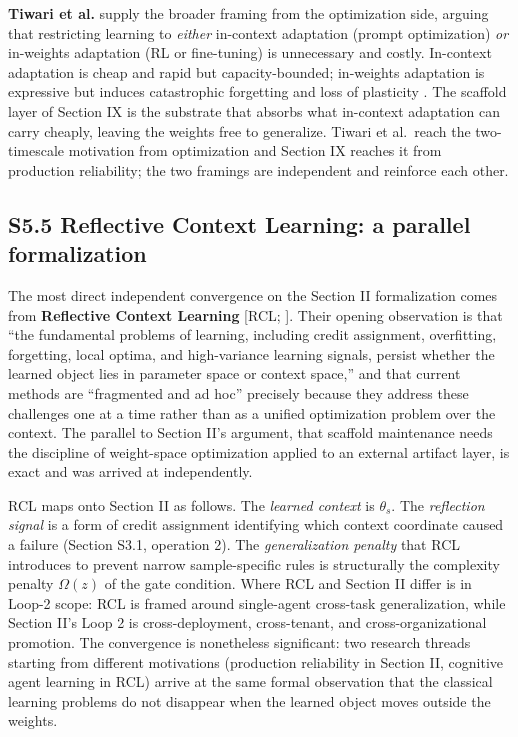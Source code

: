 \documentclass[
]{article}
\newcounter{none} %
\begin{document}
\textbf{Tiwari et al.} \cite{tiwari2026fastandslow} supply the broader
framing from the optimization side, arguing that restricting learning to
\emph{either} in-context adaptation (prompt optimization) \emph{or}
in-weights adaptation (RL or fine-tuning) is unnecessary and costly.
In-context adaptation is cheap and rapid but capacity-bounded;
in-weights adaptation is expressive but induces catastrophic forgetting
and loss of plasticity \cite{dohare2024loss}. The scaffold layer of
Section IX is the substrate that absorbs what in-context adaptation can
carry cheaply, leaving the weights free to generalize. Tiwari et
al.~reach the two-timescale motivation from optimization and Section IX
reaches it from production reliability; the two framings are independent
and reinforce each other.

\subsection{S5.5 Reflective Context Learning: a parallel
formalization}\label{s5.5-reflective-context-learning-a-parallel-formalization}

The most direct independent convergence on the Section II formalization
comes from \textbf{Reflective Context Learning} {[}RCL;
\cite{vassilyev2026rcl}{]}. Their opening observation is that ``the
fundamental problems of learning, including credit assignment,
overfitting, forgetting, local optima, and high-variance learning
signals, persist whether the learned object lies in parameter space or
context space,'' and that current methods are ``fragmented and ad hoc''
precisely because they address these challenges one at a time rather
than as a unified optimization problem over the context. The parallel to
Section II's argument, that scaffold maintenance needs the discipline of
weight-space optimization applied to an external artifact layer, is
exact and was arrived at independently.

RCL maps onto Section II as follows. The \emph{learned context} is
\(\theta_s\). The \emph{reflection signal} is a form of credit
assignment identifying which context coordinate caused a failure
(Section S3.1, operation 2). The \emph{generalization penalty} that RCL
introduces to prevent narrow sample-specific rules is structurally the
complexity penalty \(\Omega(z)\) of the gate condition. Where RCL and
Section II differ is in Loop-2 scope: RCL is framed around single-agent
cross-task generalization, while Section II's Loop 2 is
cross-deployment, cross-tenant, and cross-organizational promotion. The
convergence is nonetheless significant: two research threads starting
from different motivations (production reliability in Section II,
cognitive agent learning in RCL) arrive at the same formal observation
that the classical learning problems do not disappear when the learned
object moves outside the weights.
\end{document}
